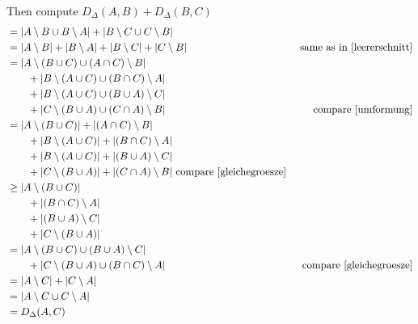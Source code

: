 \documentclass[10pt,a4paper,boxed]{hmcpset}
\begin{document}
\begin{solution}
\begin{enumerate}[(i)]
\begin{description}
							Then compute
							$D_\Delta(A,B) + D_\Delta(B,C)$ 
							\begin{align}
								&= |A \setminus B \cup B \setminus A| + |B \setminus C \cup C \setminus B| \\
								&= |A\setminus B| + | B \setminus A| + | B \setminus C| + |C \setminus B| & \text{ same as in \ref{leererschnitt}}\\
								&= | A \setminus (B \cup C) \cup (A \cap C) \setminus B| 					  \\
								&\qquad + | B \setminus ( A \cup C ) \cup (B \cap C) \setminus A | \\
								&\qquad + | B \setminus (A \cup C)  \cup (B \cup A) \setminus C |  \\
								&\qquad + | C \setminus(B \cup A) \cup (C \cap A) \setminus B|     &\text{ compare \ref{umformung}} \\
								&= | A \setminus (B \cup C)       | + | (A \cap C) \setminus B| 					  \\
								&\qquad + | B \setminus ( A \cup C ) | + | (B \cap C) \setminus A | \\
								&\qquad + | B \setminus (A \cup C)   | + | (B \cup A) \setminus C |  \\
								&\qquad + | C \setminus(B \cup A)    | + | (C \cap A) \setminus B| \text{ compare \ref{gleichegroesze}}\\
								&\geq | A \setminus (B \cup C)       | 					  \\
								&\qquad + | (B \cap C) \setminus A | \\
								&\qquad + | (B \cup A) \setminus C |  \\
								&\qquad + | C \setminus(B \cup A) | \\
								& = | A \setminus (B \cup C) \cup (B \cup A) \setminus C |  \\
								&\qquad + | C \setminus(B \cup A) \cup (B \cap C) \setminus A | & \text{ compare \ref{gleichegroesze}}\\
								& = | A \setminus C | + | C \setminus A| \\
								& = | A \setminus C \cup C \setminus A| \\
								& = D_\Delta(A,C)
							\end{align}
					\end{description}
			\end{enumerate}
		\end{solution}

	
\end{document}

